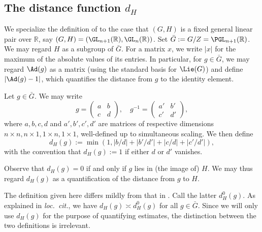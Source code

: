 \subsection{The distance function $d_H$}\label{sec:dist-funct-d_h}
We specialize the definition of  \cite[\S4.2]{2020arXiv201202187N} to the case that $(G,H)$ is a fixed general linear pair over $\mathbb{R}$, say $(G,H) = (\GL_{n+1}(\mathbb{R}), \GL_n(\mathbb{R}))$.  Set $\bar{G} := G/Z = \PGL_{n+1}(\mathbb{R})$.  We may regard $H$ as a subgroup of $\bar{G}$.  For a matrix $x$, we write $|x|$ for the maximum of the absolute values of its entries.  In particular, for $g \in \bar{G}$, we may regard $\Ad(g)$ as a matrix (using the standard basis for $\Lie(G)$) and define $|\Ad(g) - 1|$, which quantifies the distance from $g$ to the identity element.

\begin{definition}
  Let $g \in \bar{G}$.  We may write
  \begin{equation*}
    g = \begin{pmatrix}
      a & b \\
      c & d
    \end{pmatrix},
    \quad
    g^{-1} =
    \begin{pmatrix}
      a' & b' \\
      c' & d'
    \end{pmatrix},
  \end{equation*}
  where $a,b,c,d$ and $a',b',c',d'$ are matrices of respective dimensions $n \times n, n \times 1, 1 \times n, 1 \times 1$, well-defined up to simultaneous scaling.  We then define 
  \begin{equation*}
    d_H(g) := \min\left(1, |b/d| + |b'/d'| + |c/d| + |c'/d'|\right),
  \end{equation*}
  with the convention that $d_H(g) := 1$ if either $d$ or $d'$ vanishes.
\end{definition}

Observe that $d_H(g) = 0$ if and only if $g$ lies in (the image of) $H$.  We may thus regard $d_H(g)$ as a quantification of the distance from $g$ to $H$.

\begin{remark}
  The definition given here differs mildly from that in \cite[\S4.2]{2020arXiv201202187N}.  Call the latter $d_H^0(g)$.  As explained in \emph{loc.\ cit.}, we have $d_H(g) \asymp d_H^0(g)$ for all $g \in \bar{G}$.  Since we will only use $d_H(g)$ for the purpose of quantifying estimates, the distinction between the two definitions is irrelevant.
\end{remark}

